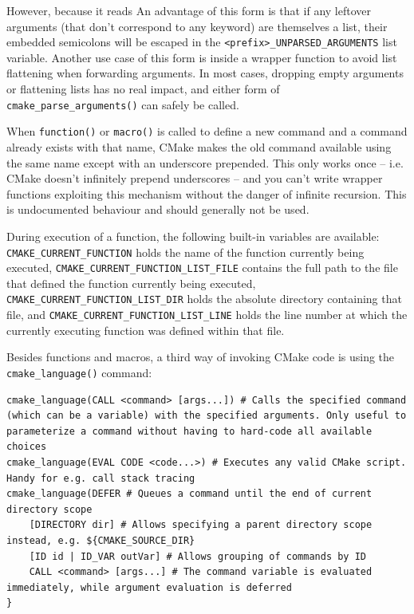 \documentclass[table, xcdraw]{article}%
\begin{document}
However, because it reads %
An advantage of this form is that if any leftover arguments (that don't correspond to any keyword) are themselves a list, their embedded semicolons will be escaped in the \texttt{<prefix>_UNPARSED_ARGUMENTS} list variable. Another use case of this form is inside a wrapper function to avoid list flattening when forwarding arguments. In most cases, dropping empty arguments or flattening lists has no real impact, and either form of \texttt{cmake_parse_arguments()} can safely be called.

When \texttt{function()} or \texttt{macro()} is called to define a new command and a command already exists with that name, CMake makes the old command available using the same name except with an underscore prepended. This only works once -- i.e. CMake doesn't infinitely prepend underscores -- and you can't write wrapper functions exploiting this mechanism without the danger of infinite recursion. This is undocumented behaviour and should generally not be used.

During execution of a function, the following built-in variables are available: \texttt{CMAKE_CURRENT_FUNCTION} holds the name of the function currently being executed, \texttt{CMAKE_CURRENT_FUNCTION_LIST_FILE} contains the full path to the file that defined the function currently being executed, \texttt{CMAKE_CURRENT_FUNCTION_LIST_DIR} holds the absolute directory containing that file, and \texttt{CMAKE_CURRENT_FUNCTION_LIST_LINE} holds the line number at which the currently executing function was defined within that file.

Besides functions and macros, a third way of invoking CMake code is using the \texttt{cmake_language()} command:

\begin{verbatim}
cmake_language(CALL <command> [args...]) # Calls the specified command (which can be a variable) with the specified arguments. Only useful to parameterize a command without having to hard-code all available choices
cmake_language(EVAL CODE <code...>) # Executes any valid CMake script. Handy for e.g. call stack tracing
cmake_language(DEFER # Queues a command until the end of current directory scope
    [DIRECTORY dir] # Allows specifying a parent directory scope instead, e.g. ${CMAKE_SOURCE_DIR}
    [ID id | ID_VAR outVar] # Allows grouping of commands by ID
    CALL <command> [args...] # The command variable is evaluated immediately, while argument evaluation is deferred
}
\end{verbatim}
\end{document}
